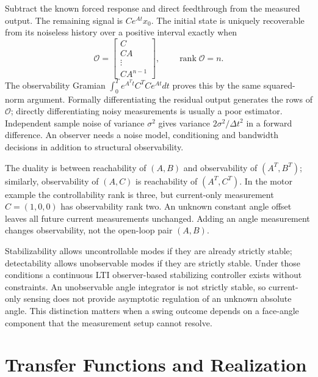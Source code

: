 Subtract the known forced response and direct feedthrough from the measured output. The remaining signal is $Ce^{At}x_0$. The initial state is uniquely recoverable from its noiseless history over a positive interval exactly when
\begin{equation}
\label{eq:observability_matrix}
 \mathcal O=\begin{bmatrix}C\\CA\\\vdots\\CA^{n-1}\end{bmatrix},\qquad
 \operatorname{rank}\mathcal O=n.
\end{equation}
\label{def:observability_def}
\label{thm:observability_rank}
\label{thm:kalman_observability}
The observability Gramian $\int_0^T e^{A^Tt}C^TCe^{At}dt$ proves this by the same squared-norm argument. Formally differentiating the residual output generates the rows of $\mathcal O$; directly differentiating noisy measurements is usually a poor estimator. Independent sample noise of variance $\sigma^2$ gives variance $2\sigma^2/\Delta t^2$ in a forward difference. An observer needs a noise model, conditioning and bandwidth decisions in addition to structural observability.

The duality is between reachability of $(A,B)$ and observability of $(A^T,B^T)$; similarly, observability of $(A,C)$ is reachability of $(A^T,C^T)$. In the motor example the controllability rank is three, but current-only measurement $C=(1,0,0)$ has observability rank two. An unknown constant angle offset leaves all future current measurements unchanged. Adding an angle measurement changes observability, not the open-loop pair $(A,B)$.

Stabilizability allows uncontrollable modes if they are already strictly stable; detectability allows unobservable modes if they are strictly stable. Under those conditions a continuous LTI observer-based stabilizing controller exists without constraints. An unobservable angle integrator is not strictly stable, so current-only sensing does not provide asymptotic regulation of an unknown absolute angle. This distinction matters when a swing outcome depends on a face-angle component that the measurement setup cannot resolve.

\section{Transfer Functions and Realization}
\label{sec:transfer_function_conversion}
\label{sec:kalman_history}
\label{laymans:history_box}

